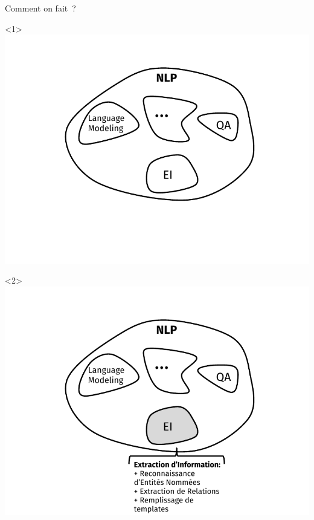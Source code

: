 \documentclass[10pt]{beamer}
\begin{document}
\begin{frame}{Comment on fait~?}
	\begin{onlyenv}\vspace*{\fill}\includegraphics[width=1\linewidth]{"img/nlp_diag"}\vspace*{\fill}\end{onlyenv}		\begin{onlyenv}<2>\vspace*{\fill}\includegraphics[width=1\linewidth]{"img/nlp_diag2"}\vspace*{\fill}\end{onlyenv}

\end{frame}
\end{document}
